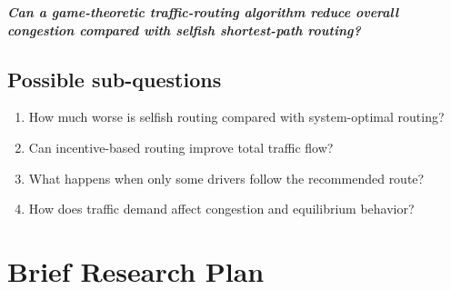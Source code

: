 \documentclass[11pt,a4paper]{article}
\begin{document}
\noindent\textit{\textbf{Can a game-theoretic traffic-routing algorithm reduce overall congestion compared with selfish shortest-path routing?}}

\subsection*{Possible sub-questions}
\begin{enumerate}
    \item How much worse is selfish routing compared with system-optimal routing?
    \item Can incentive-based routing improve total traffic flow?
    \item What happens when only some drivers follow the recommended route?
    \item How does traffic demand affect congestion and equilibrium behavior?
\end{enumerate}

\section{Brief Research Plan}
\end{document}
